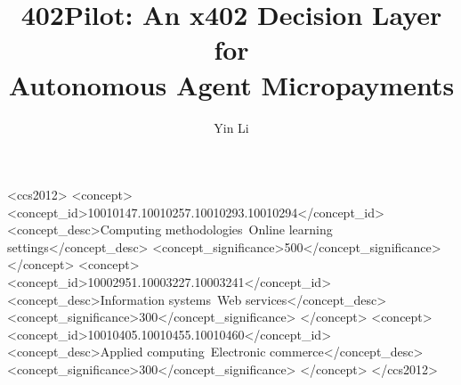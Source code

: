 \documentclass[sigconf, anonymous, review]{acmart}
\theoremstyle{remark}
\begin{document}
\title[402Pilot]{\texorpdfstring{402Pilot: An x402 Decision Layer for\\Autonomous Agent Micropayments}{402Pilot: An x402 Decision Layer for Autonomous Agent Micropayments}}

\author{Yin Li}



\renewcommand{\shortauthors}{Li}

\begin{abstract}

\end{abstract}

\begin{CCSXML}
<ccs2012>
 <concept>
  <concept_id>10010147.10010257.10010293.10010294</concept_id>
  <concept_desc>Computing methodologies~Online learning settings</concept_desc>
  <concept_significance>500</concept_significance>
 </concept>
 <concept>
  <concept_id>10002951.10003227.10003241</concept_id>
  <concept_desc>Information systems~Web services</concept_desc>
  <concept_significance>300</concept_significance>
 </concept>
 <concept>
  <concept_id>10010405.10010455.10010460</concept_id>
  <concept_desc>Applied computing~Electronic commerce</concept_desc>
  <concept_significance>300</concept_significance>
 </concept>
</ccs2012>
\end{CCSXML}

\end{document}
